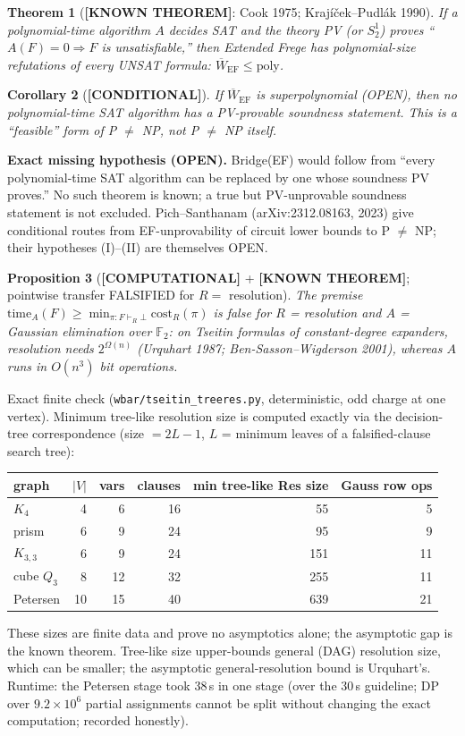 \documentclass[11pt]{article}
\newtheorem{theorem}{Theorem}
\newtheorem{proposition}[theorem]{Proposition}
\newtheorem{corollary}[theorem]{Corollary}
\theoremstyle{remark}
\newcommand{\Wbar}{\overline{W}}
\newcommand{\status}[1]{\textbf{[#1]}}
\begin{document}
\begin{theorem}[\status{KNOWN THEOREM}: Cook 1975; Kraj\'i\v{c}ek--Pudl\'ak 1990]\label{thm:pv}
If a polynomial-time algorithm $A$ decides SAT and the theory PV (or $S^1_2$) proves
``$A(F)=0\Rightarrow F$ is unsatisfiable,'' then Extended Frege has polynomial-size
refutations of every UNSAT formula: $\Wbar_{\mathrm{EF}}\le\mathrm{poly}$.
\end{theorem}
\begin{corollary}[\status{CONDITIONAL}]
If $\Wbar_{\mathrm{EF}}$ is superpolynomial (OPEN), then no polynomial-time SAT algorithm
has a PV-provable soundness statement. This is a ``feasible'' form of P $\neq$ NP, not
P $\neq$ NP itself.
\end{corollary}
\noindent\textbf{Exact missing hypothesis (OPEN).} Bridge(EF) would follow from
``every polynomial-time SAT algorithm can be replaced by one whose soundness PV proves.''
No such theorem is known; a true but PV-unprovable soundness statement is not excluded.
Pich--Santhanam (arXiv:2312.08163, 2023) give conditional routes from EF-unprovability of
circuit lower bounds to P $\neq$ NP; their hypotheses (I)--(II) are themselves OPEN.

\begin{proposition}[\status{COMPUTATIONAL} + \status{KNOWN THEOREM}; pointwise transfer FALSIFIED for $R=$ resolution]\label{prop:tseitin}
The premise $\mathrm{time}_A(F)\ge\min_{\pi:F\vdash_R\bot}\mathrm{cost}_R(\pi)$ is false for
$R$ = resolution and $A$ = Gaussian elimination over $\mathbb{F}_2$: on Tseitin formulas of
constant-degree expanders, resolution needs $2^{\Omega(n)}$ (Urquhart 1987;
Ben-Sasson--Wigderson 2001), whereas $A$ runs in $O(n^3)$ bit operations.
\end{proposition}
Exact finite check (\texttt{wbar/tseitin\_treeres.py}, deterministic, odd charge at one vertex).
Minimum tree-like resolution size is computed exactly via the decision-tree correspondence
(size $=2L-1$, $L$ = minimum leaves of a falsified-clause search tree):

\begin{center}
\begin{tabular}{lrrrrr}
\toprule
graph & $|V|$ & vars & clauses & min tree-like Res size & Gauss row ops\\
\midrule
$K_4$ & 4 & 6 & 16 & 55 & 5\\
prism & 6 & 9 & 24 & 95 & 9\\
$K_{3,3}$ & 6 & 9 & 24 & 151 & 11\\
cube $Q_3$ & 8 & 12 & 32 & 255 & 11\\
Petersen & 10 & 15 & 40 & 639 & 21\\
\bottomrule
\end{tabular}
\end{center}
These sizes are finite data and prove no asymptotics alone; the asymptotic gap is the known
theorem. Tree-like size upper-bounds general (DAG) resolution size, which can be smaller;
the asymptotic general-resolution bound is Urquhart's. Runtime: the
Petersen stage took 38\,s in one stage (over the 30\,s guideline; DP over $9.2\times10^6$
partial assignments cannot be split without changing the exact computation; recorded honestly).
\end{document}
